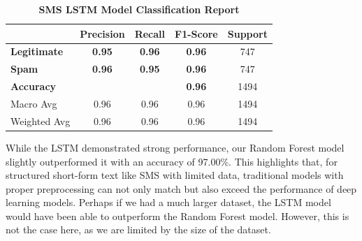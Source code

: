 \documentclass{article}
\begin{document}
\begin{table}[htbp]
    \centering
    \caption{\textbf{SMS LSTM Model Classification Report}}
    \begin{tabular}{l c c c c}
    \toprule
     & \textbf{Precision} & \textbf{Recall} & \textbf{F1-Score} & Support \\
    \midrule
    \textbf{Legitimate} & \textbf{0.95} & \textbf{0.96} & \textbf{0.96} & 747 \\
    \textbf{Spam} & \textbf{0.96} & \textbf{0.95} & \textbf{0.96} & 747 \\
    \midrule
    \textbf{Accuracy} & & & \textbf{0.96} & 1494 \\
    Macro Avg & 0.96 & 0.96 & 0.96 & 1494 \\
    Weighted Avg & 0.96 & 0.96 & 0.96 & 1494 \\
    \bottomrule
    \end{tabular}
    \label{tab:classification_report_6}
\end{table}

\noindent
While the LSTM demonstrated strong performance, our Random Forest model slightly outperformed it with an accuracy of 97.00\%. This highlights that, for structured short-form text like SMS with limited data, traditional models with proper preprocessing can not only match but also exceed the performance of deep learning models. Perhaps if we had a much larger dataset, the LSTM model would have been able to outperform the Random Forest model. However, this is not the case here, as we are limited by the size of the dataset.


\end{document}
